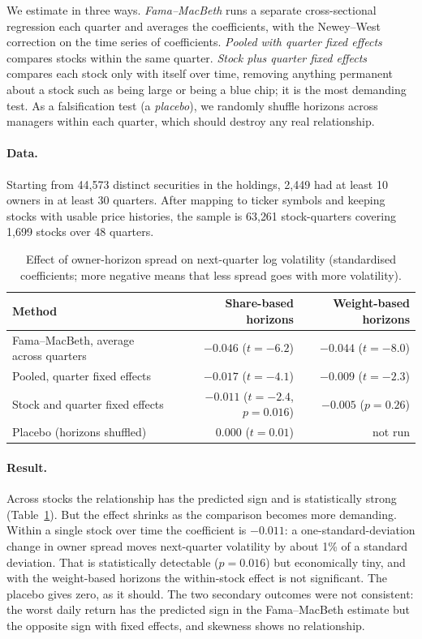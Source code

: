 We estimate in three ways. \emph{Fama--MacBeth} runs a separate cross-sectional regression each quarter and averages the coefficients, with the Newey--West correction on the time series of coefficients. \emph{Pooled with quarter fixed effects} compares stocks within the same quarter. \emph{Stock plus quarter fixed effects} compares each stock only with itself over time, removing anything permanent about a stock such as being large or being a blue chip; it is the most demanding test. As a falsification test (a \emph{placebo}), we randomly shuffle horizons across managers within each quarter, which should destroy any real relationship.

\paragraph{Data.} Starting from 44{,}573 distinct securities in the holdings, 2{,}449 had at least 10 owners in at least 30 quarters. After mapping to ticker symbols and keeping stocks with usable price histories, the sample is 63{,}261 stock-quarters covering 1{,}699 stocks over 48 quarters.

\begin{table}[htbp]
\centering
\caption{Effect of owner-horizon spread on next-quarter log volatility (standardised coefficients; more negative means that less spread goes with more volatility).}
\label{tab:stock}
\begin{tabular}{lrr}
\toprule
Method & Share-based horizons & Weight-based horizons\\
\midrule
Fama--MacBeth, average across quarters & $-0.046$ ($t=-6.2$) & $-0.044$ ($t=-8.0$)\\
Pooled, quarter fixed effects & $-0.017$ ($t=-4.1$) & $-0.009$ ($t=-2.3$)\\
Stock and quarter fixed effects & $-0.011$ ($t=-2.4$, $p=0.016$) & $-0.005$ ($p=0.26$)\\
Placebo (horizons shuffled) & $0.000$ ($t=0.01$) & not run\\
\bottomrule
\end{tabular}
\end{table}

\paragraph{Result.} Across stocks the relationship has the predicted sign and is statistically strong (Table~\ref{tab:stock}). But the effect shrinks as the comparison becomes more demanding. Within a single stock over time the coefficient is $-0.011$: a one-standard-deviation change in owner spread moves next-quarter volatility by about 1\% of a standard deviation. That is statistically detectable ($p=0.016$) but economically tiny, and with the weight-based horizons the within-stock effect is not significant. The placebo gives zero, as it should. The two secondary outcomes were not consistent: the worst daily return has the predicted sign in the Fama--MacBeth estimate but the opposite sign with fixed effects, and skewness shows no relationship.

